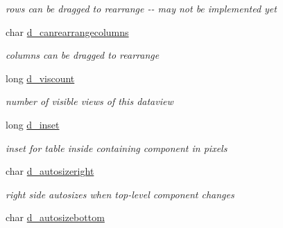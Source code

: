 \begin{DoxyCompactItemize}
\begin{DoxyCompactList}\small\item\em rows can be dragged to rearrange -\/-\/ may not be implemented yet \item\end{DoxyCompactList}\item 
\hypertarget{structt__jdataview_a3dd9e3c7b86fb954205b489b193bea75}{
char \hyperlink{structt__jdataview_a3dd9e3c7b86fb954205b489b193bea75}{d\_\-canrearrangecolumns}}
\label{structt__jdataview_a3dd9e3c7b86fb954205b489b193bea75}

\begin{DoxyCompactList}\small\item\em columns can be dragged to rearrange \item\end{DoxyCompactList}\item 
\hypertarget{structt__jdataview_a4d2256e9fc904baaad1ff824baa3652c}{
long \hyperlink{structt__jdataview_a4d2256e9fc904baaad1ff824baa3652c}{d\_\-viscount}}
\label{structt__jdataview_a4d2256e9fc904baaad1ff824baa3652c}

\begin{DoxyCompactList}\small\item\em number of visible views of this dataview \item\end{DoxyCompactList}\item 
\hypertarget{structt__jdataview_a08fbca98a68cf49f0a8303c3d53c1f24}{
long \hyperlink{structt__jdataview_a08fbca98a68cf49f0a8303c3d53c1f24}{d\_\-inset}}
\label{structt__jdataview_a08fbca98a68cf49f0a8303c3d53c1f24}

\begin{DoxyCompactList}\small\item\em inset for table inside containing component in pixels \item\end{DoxyCompactList}\item 
\hypertarget{structt__jdataview_a05d85540947dc8892b8cab63e96e1ea7}{
char \hyperlink{structt__jdataview_a05d85540947dc8892b8cab63e96e1ea7}{d\_\-autosizeright}}
\label{structt__jdataview_a05d85540947dc8892b8cab63e96e1ea7}

\begin{DoxyCompactList}\small\item\em right side autosizes when top-\/level component changes \item\end{DoxyCompactList}\item 
\hypertarget{structt__jdataview_a95281c668ca437c9f92dbe7e9b2aa7ee}{
char \hyperlink{structt__jdataview_a95281c668ca437c9f92dbe7e9b2aa7ee}{d\_\-autosizebottom}}
\label{structt__jdataview_a95281c668ca437c9f92dbe7e9b2aa7ee}


\end{DoxyCompactItemize}
